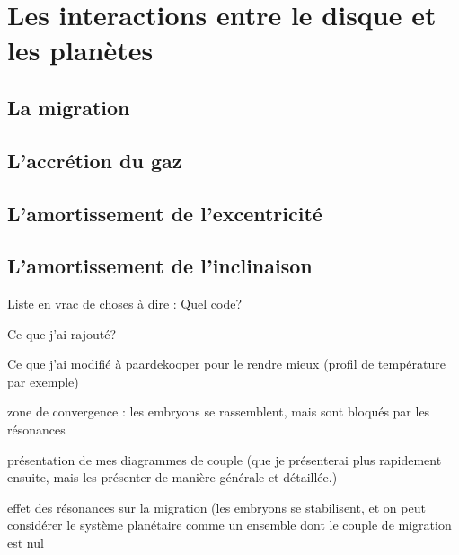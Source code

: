 \documentclass[a4paper,twoside]{article}
\begin{document}
\section{Les interactions entre le disque et les planètes}
\subsection{La migration}

\subsection{L'accrétion du gaz}

\subsection{L'amortissement de l'excentricité}%

\subsection{L'amortissement de l'inclinaison}%









Liste en vrac de choses à dire : 
Quel code?

Ce que j'ai rajouté? 

Ce que j'ai modifié à paardekooper pour le rendre mieux (profil de température par exemple)

zone de convergence : les embryons se rassemblent, mais sont bloqués par les résonances

présentation de mes diagrammes de couple (que je présenterai plus rapidement ensuite, mais les présenter de manière générale et détaillée.)

effet des résonances sur la migration (les embryons se stabilisent, et on peut considérer le système planétaire comme un ensemble dont le couple de migration est nul
\end{document}
